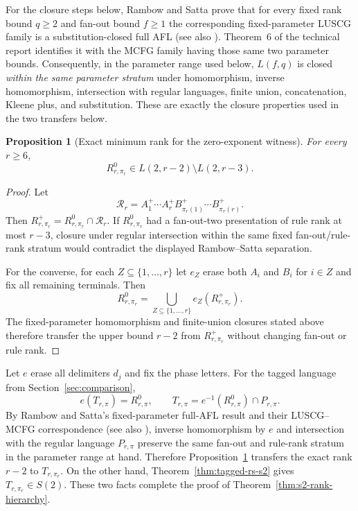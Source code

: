 \documentclass[11pt,a4paper]{article}
\numberwithin{equation}{section}
\theoremstyle{plain}
\newtheorem{proposition}[theorem]{Proposition}
\theoremstyle{definition}
\theoremstyle{remark}
\begin{document}
For the closure steps below, Rambow and Satta prove that for every fixed rank
bound $q\ge2$ and fan-out bound $f\ge1$ the corresponding fixed-parameter
LUSCG family is a substitution-closed full AFL
\cite[Theorem~5]{RambowSatta1994} (see also \cite{RambowSatta1999}).
Theorem~6 of the technical report identifies it with the MCFG family having
those same two parameter bounds.  Consequently, in the parameter
range used below, $L(f,q)$ is closed \emph{within the same parameter stratum}
under homomorphism, inverse homomorphism, intersection with regular languages,
finite union, concatenation, Kleene plus, and substitution.  These are exactly
the closure properties used in the two transfers below.

\begin{proposition}[Exact minimum rank for the zero-exponent witness]
\label{prop:rs-zero-rank-only}
For every $r\ge6$,
\[
 R^0_{r,\pi_r}\in L(2,r-2)\setminus L(2,r-3).
\]
\end{proposition}

\begin{proof}
Let
\[
 \mathcal R_r=A_1^+\cdots A_r^+
 B_{\pi_r(1)}^+\cdots B_{\pi_r(r)}^+.
\]
Then $R^+_{r,\pi_r}=R^0_{r,\pi_r}\cap\mathcal R_r$.  If
$R^0_{r,\pi_r}$ had a fan-out-two presentation of rule rank at most $r-3$,
closure under regular intersection within the same fixed fan-out/rule-rank
stratum would contradict the displayed Rambow--Satta separation.

For the converse, for each $Z\subseteq\{1,\ldots,r\}$ let $e_Z$ erase both
$A_i$ and $B_i$ for $i\in Z$ and fix all remaining terminals.  Then
\[
 R^0_{r,\pi_r}=\bigcup_{Z\subseteq\{1,\ldots,r\}} e_Z(R^+_{r,\pi_r}).
\]
The fixed-parameter homomorphism and finite-union closures stated above
therefore transfer the upper bound $r-2$ from $R^+_{r,\pi_r}$ without
changing fan-out or rule rank.
\end{proof}

Let $e$ erase all delimiters $d_j$ and fix the phase letters.  For the tagged
language from Section~\ref{sec:comparison},
\[
 e(T_{r,\pi})=R^0_{r,\pi},
 \qquad
 T_{r,\pi}=e^{-1}(R^0_{r,\pi})\cap P_{r,\pi}.
\]
By Rambow and Satta's fixed-parameter full-AFL result and their
LUSCG--MCFG correspondence \cite[Theorems~5 and~6]{RambowSatta1994}
(see also \cite{RambowSatta1999}), inverse homomorphism by $e$ and intersection
with the regular language $P_{r,\pi}$ preserve the same fan-out and
rule-rank stratum in the parameter range at hand.  Therefore
Proposition~\ref{prop:rs-zero-rank-only}
transfers the exact rank $r-2$ to $T_{r,\pi_r}$.  On the other hand,
Theorem~\ref{thm:tagged-rs-s2} gives $T_{r,\pi_r}\in S(2)$.  These two facts
complete the proof of Theorem~\ref{thm:s2-rank-hierarchy}.
\end{document}
